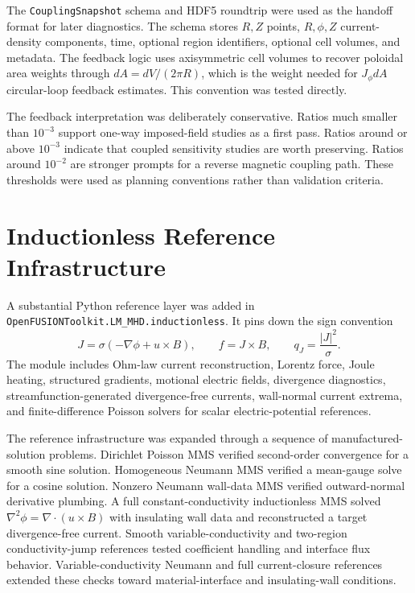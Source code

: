 \documentclass[11pt]{article}
\begin{document}
The \texttt{CouplingSnapshot} schema and HDF5 roundtrip were used as the handoff format for later diagnostics. The schema stores \(R,Z\) points, \(R,\phi,Z\) current-density components, time, optional region identifiers, optional cell volumes, and metadata. The feedback logic uses axisymmetric cell volumes to recover poloidal area weights through \(dA = dV/(2\pi R)\), which is the weight needed for \(J_\phi dA\) circular-loop feedback estimates. This convention was tested directly.

The feedback interpretation was deliberately conservative. Ratios much smaller than \(10^{-3}\) support one-way imposed-field studies as a first pass. Ratios around or above \(10^{-3}\) indicate that coupled sensitivity studies are worth preserving. Ratios around \(10^{-2}\) are stronger prompts for a reverse magnetic coupling path. These thresholds were used as planning conventions rather than validation criteria.

\section{Inductionless Reference Infrastructure}

A substantial Python reference layer was added in \texttt{OpenFUSIONToolkit.LM\_MHD.inductionless}. It pins down the sign convention
\[
J = \sigma(-\nabla\phi + u \times B), \qquad f = J \times B, \qquad q_J = \frac{|J|^2}{\sigma}.
\]
The module includes Ohm-law current reconstruction, Lorentz force, Joule heating, structured gradients, motional electric fields, divergence diagnostics, streamfunction-generated divergence-free currents, wall-normal current extrema, and finite-difference Poisson solvers for scalar electric-potential references.

The reference infrastructure was expanded through a sequence of manufactured-solution problems. Dirichlet Poisson MMS verified second-order convergence for a smooth sine solution. Homogeneous Neumann MMS verified a mean-gauge solve for a cosine solution. Nonzero Neumann wall-data MMS verified outward-normal derivative plumbing. A full constant-conductivity inductionless MMS solved \(\nabla^2\phi = \nabla\cdot(u\times B)\) with insulating wall data and reconstructed a target divergence-free current. Smooth variable-conductivity and two-region conductivity-jump references tested coefficient handling and interface flux behavior. Variable-conductivity Neumann and full current-closure references extended these checks toward material-interface and insulating-wall conditions.
\end{document}
